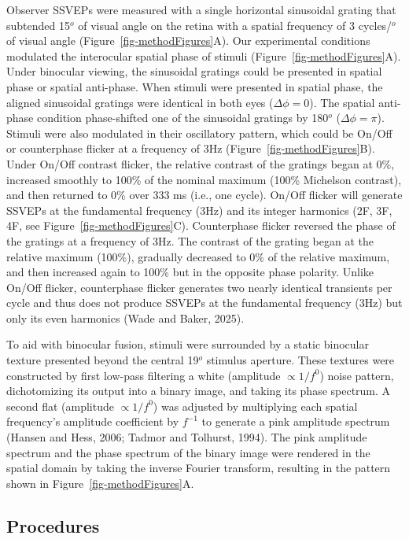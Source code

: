\documentclass[
  12pt,
]{article}
\begin{document}
Observer SSVEPs were measured with a single horizontal sinusoidal
grating that subtended 15\(^o\) of visual angle on the retina with a
spatial frequency of 3 cycles/\(^o\) of visual angle
(Figure~\ref{fig-methodFigures}A). Our experimental conditions modulated
the interocular spatial phase of stimuli
(Figure~\ref{fig-methodFigures}A). Under binocular viewing, the
sinusoidal gratings could be presented in spatial phase or spatial
anti-phase. When stimuli were presented in spatial phase, the aligned
sinusoidal gratings were identical in both eyes (\(\Delta \phi = 0\)).
The spatial anti-phase condition phase-shifted one of the sinusoidal
gratings by 180\(^o\) (\(\Delta \phi = \pi\)). Stimuli were also
modulated in their oscillatory pattern, which could be On/Off or
counterphase flicker at a frequency of 3Hz
(Figure~\ref{fig-methodFigures}B). Under On/Off contrast flicker, the
relative contrast of the gratings began at 0\%, increased smoothly to
100\% of the nominal maximum (100\% Michelson contrast), and then
returned to 0\% over 333 ms (i.e., one cycle). On/Off flicker will
generate SSVEPs at the fundamental frequency (3Hz) and its integer
harmonics (2F, 3F, 4F, see Figure~\ref{fig-methodFigures}C).
Counterphase flicker reversed the phase of the gratings at a frequency
of 3Hz. The contrast of the grating began at the relative maximum
(100\%), gradually decreased to 0\% of the relative maximum, and then
increased again to 100\% but in the opposite phase polarity. Unlike
On/Off flicker, counterphase flicker generates two nearly identical
transients per cycle and thus does not produce SSVEPs at the fundamental
frequency (3Hz) but only its even harmonics (Wade and Baker, 2025).

To aid with binocular fusion, stimuli were surrounded by a static
binocular texture presented beyond the central 19\(^o\) stimulus
aperture. These textures were constructed by first low-pass filtering a
white (amplitude \(\propto 1/f^0\)) noise pattern, dichotomizing its
output into a binary image, and taking its phase spectrum. A second flat
(amplitude \(\propto 1/f^0\)) was adjusted by multiplying each spatial
frequency's amplitude coefficient by \(f^{-1}\) to generate a pink
amplitude spectrum (Hansen and Hess, 2006; Tadmor and Tolhurst, 1994).
The pink amplitude spectrum and the phase spectrum of the binary image
were rendered in the spatial domain by taking the inverse Fourier
transform, resulting in the pattern shown in
Figure~\ref{fig-methodFigures}A.

\subsection{Procedures}\label{procedures}
\end{document}
